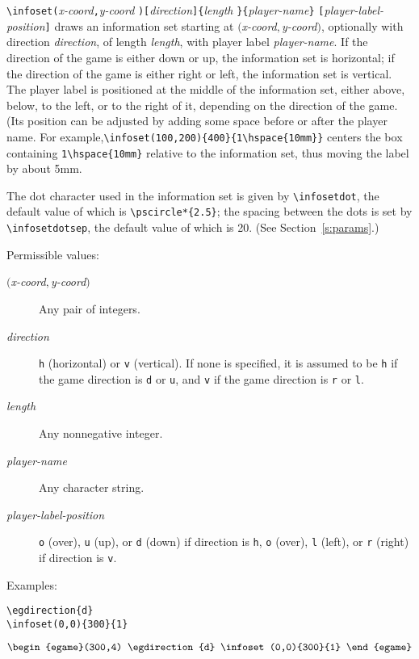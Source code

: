 \documentclass[12pt]{article}
\begin{document}
\noindent\verb+\infoset(+\emph{x-coord}\verb+,+\emph{y-coord}%
\verb+)[+\emph{direction}\verb+]{+\emph{length}%
\verb+}{+\emph{player-name}\verb+}+\newline
\verb+[+\emph{player-label-position}\verb+]+\newline
\noindent draws an information set starting at
$($\emph{x-coord}$,$\emph{y-coord}$)$, optionally with direction
\emph{direction}, of length \emph{length}, with player label
\emph{player-name}.  If the direction of the game is either down or up, the
information set is horizontal; if the direction of the game is either right or
left, the information set is vertical.  The player label is positioned at the
middle of the information set, either above, below, to the left, or to the
right of it, depending on the direction of the game.  (Its position can be
adjusted by adding some space before or after the player name.  For
example,\newline \verb+\infoset(100,200){400}{1\hspace{10mm}}+\newline
centers the box containing \verb+1\hspace{10mm}+ relative to the information
set, thus moving the label by about 5mm.

The dot character used in the information set is given by \verb+\infosetdot+,
the default value of which is \verb+\pscircle*{2.5}+; the spacing between the
dots is set by \verb+\infosetdotsep+, the default value of which is 20.  (See
Section~\ref{s:params}.)

Permissible values:
\begin{description}
\item[$($\emph{x-coord}$,$\emph{y-coord}$)$] Any pair of integers.
\item[\emph{direction}] {\tt h} (horizontal) or {\tt v} (vertical).  If none
is specified, it is assumed to be \verb+h+ if the game direction is \verb+d+
or \verb+u+, and \verb+v+ if the game direction is \verb+r+ or \verb+l+.
\item[\emph{length}] Any nonnegative integer.
\item[\emph{player-name}] Any character string.
\item[\emph{player-label-position}] \verb+o+ (over), \verb+u+ (up), or
\verb+d+ (down) if direction is \verb+h+, \verb+o+ (over), \verb+l+ (left), or
\verb+r+ (right) if direction is \verb+v+.
\end{description}

Examples:
\begin{verbatim}
\egdirection{d}
\infoset(0,0){300}{1}
\end{verbatim}
$$\begin{egame}(300,4)
\egdirection{d}
\infoset(0,0){300}{1}
\end{egame}$$
\end{document}
